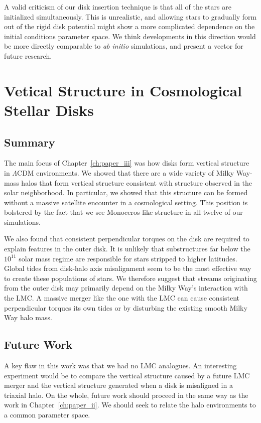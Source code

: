 A valid criticism of our disk insertion technique is that all of the stars are initialized simultaneously. This is unrealistic, and allowing stars to gradually form out of the rigid disk potential might show a more complicated dependence on the initial conditions parameter space. We think developments in this direction would be more directly comparable to \textit{ab initio} simulations, and present a vector for future research.


\section{Vetical Structure in Cosmological Stellar Disks}
\subsection{Summary}

The main focus of Chapter~\ref{ch:paper_iii} was how disks form vertical structure in $\Lambda$CDM environments. We showed that there are a wide variety of Milky Way-mass halos that form vertical structure consistent with structure observed in the solar neighborhood. In particular, we showed that this structure can be formed without a massive satellite encounter in a cosmological setting. This position is bolstered by the fact that we see Monoceros-like structure in all twelve of our simulations.

We also found that consistent perpendicular torques on the disk are required to explain features in the outer disk. It is unlikely that substructures far below the $10^{11}$ solar mass regime are responsible for stars stripped to higher latitudes. Global tides from disk-halo axis misalignment seem to be the most effective way to create these populations of stars. We therefore suggest that streams originating from the outer disk may primarily depend on the Milky Way's interaction with the LMC. A massive merger like the one with the LMC can cause consistent perpendicular torques its own tides or by disturbing the existing smooth Milky Way halo mass. 

\subsection{Future Work}

A key flaw in this work was that we had no LMC analogues. An interesting experiment would be to compare the vertical structure caused by a future LMC merger and the vertical structure generated when a disk is misaligned in a triaxial halo. On the whole, future work should proceed in the same way as the work in Chapter~\ref{ch:paper_ii}. We should seek to relate the halo environments to a common parameter space.

